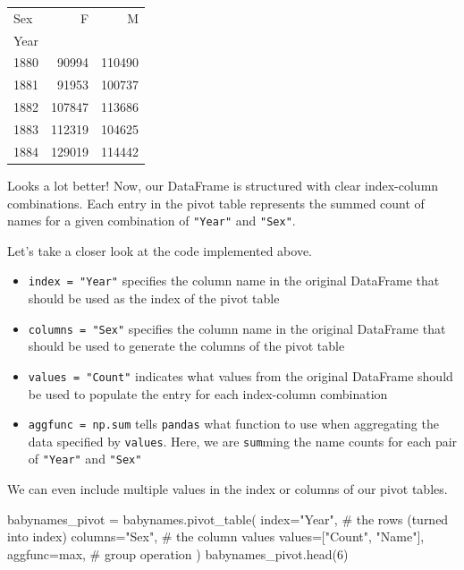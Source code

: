 \documentclass[
  letterpaper,
  DIV=11,
  numbers=noendperiod]{scrreprt}
\newenvironment{Shaded}{\begin{snugshade}}{\end{snugshade}}
\newcommand{\BuiltInTok}[1]{\textcolor[rgb]{0.00,0.23,0.31}{#1}}
\newcommand{\CommentTok}[1]{\textcolor[rgb]{0.37,0.37,0.37}{#1}}
\newcommand{\DecValTok}[1]{\textcolor[rgb]{0.68,0.00,0.00}{#1}}
\newcommand{\NormalTok}[1]{\textcolor[rgb]{0.00,0.23,0.31}{#1}}
\newcommand{\OperatorTok}[1]{\textcolor[rgb]{0.37,0.37,0.37}{#1}}
\newcommand{\StringTok}[1]{\textcolor[rgb]{0.13,0.47,0.30}{#1}}
\providecommand{\tightlist}{%
  \setlength{\itemsep}{0pt}\setlength{\parskip}{0pt}}\usepackage{longtable,booktabs,array}
\begin{document}
\begin{tabular}{lrr}
\toprule
Sex &       F &       M \\
Year &         &         \\
\midrule
1880 &   90994 &  110490 \\
1881 &   91953 &  100737 \\
1882 &  107847 &  113686 \\
1883 &  112319 &  104625 \\
1884 &  129019 &  114442 \\
\bottomrule
\end{tabular}

Looks a lot better! Now, our DataFrame is structured with clear
index-column combinations. Each entry in the pivot table represents the
summed count of names for a given combination of \texttt{"Year"} and
\texttt{"Sex"}.

Let's take a closer look at the code implemented above.

\begin{itemize}
\tightlist
\item
  \texttt{index\ =\ "Year"} specifies the column name in the original
  DataFrame that should be used as the index of the pivot table
\item
  \texttt{columns\ =\ "Sex"} specifies the column name in the original
  DataFrame that should be used to generate the columns of the pivot
  table
\item
  \texttt{values\ =\ "Count"} indicates what values from the original
  DataFrame should be used to populate the entry for each index-column
  combination
\item
  \texttt{aggfunc\ =\ np.sum} tells \texttt{pandas} what function to use
  when aggregating the data specified by \texttt{values}. Here, we are
  \texttt{sum}ming the name counts for each pair of \texttt{"Year"} and
  \texttt{"Sex"}
\end{itemize}

We can even include multiple values in the index or columns of our pivot
tables.

\begin{Shaded}
\begin{Highlighting}[]
\NormalTok{babynames\_pivot }\OperatorTok{=}\NormalTok{ babynames.pivot\_table(}
\NormalTok{    index}\OperatorTok{=}\StringTok{"Year"}\NormalTok{,     }\CommentTok{\# the rows (turned into index)}
\NormalTok{    columns}\OperatorTok{=}\StringTok{"Sex"}\NormalTok{,    }\CommentTok{\# the column values}
\NormalTok{    values}\OperatorTok{=}\NormalTok{[}\StringTok{"Count"}\NormalTok{, }\StringTok{"Name"}\NormalTok{], }
\NormalTok{    aggfunc}\OperatorTok{=}\BuiltInTok{max}\NormalTok{,   }\CommentTok{\# group operation}
\NormalTok{)}
\NormalTok{babynames\_pivot.head(}\DecValTok{6}\NormalTok{)}
\end{Highlighting}
\end{Shaded}
\end{document}
